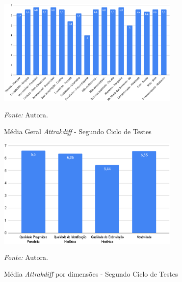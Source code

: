 \newpage

\begin{figure}[h!]
	\centering
	\caption{Média Geral \textit{Attrakdiff} - Segundo Ciclo de Testes}
	\begin{adjustbox}{center}
		\includegraphics[width=0.8\textwidth]{figuras/media-geral1.eps}
	\end{adjustbox}
	\begin{tablenotes}[flushleft]
		\centering
		\item \textit{Fonte:} Autora.
	\end{tablenotes}
	\label{fig28}
\end{figure}

\begin{figure}[h!]
	\centering
	\caption{Média \textit{Attrakdiff} por dimensões - Segundo Ciclo de Testes}
	\begin{adjustbox}{center}
		\includegraphics[width=0.8\textwidth]{figuras/media-separada1.eps}
	\end{adjustbox}
	\begin{tablenotes}[flushleft]
		\centering
		\item \textit{Fonte:} Autora.
	\end{tablenotes}
	\label{fig29}
\end{figure}

